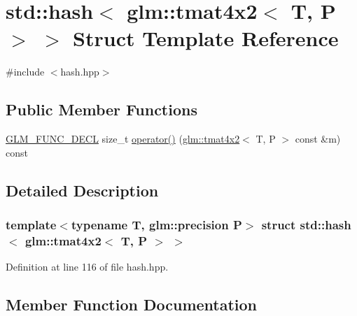 \hypertarget{structstd_1_1hash_3_01glm_1_1tmat4x2_3_01_t_00_01_p_01_4_01_4}{}\section{std\+::hash$<$ glm\+::tmat4x2$<$ T, P $>$ $>$ Struct Template Reference}
\label{structstd_1_1hash_3_01glm_1_1tmat4x2_3_01_t_00_01_p_01_4_01_4}


{\ttfamily \#include $<$hash.\+hpp$>$}

\subsection*{Public Member Functions}
\begin{DoxyCompactItemize}
\item 
\mbox{\hyperlink{setup_8hpp_ab2d052de21a70539923e9bcbf6e83a51}{G\+L\+M\+\_\+\+F\+U\+N\+C\+\_\+\+D\+E\+CL}} size\+\_\+t \mbox{\hyperlink{structstd_1_1hash_3_01glm_1_1tmat4x2_3_01_t_00_01_p_01_4_01_4_af4488eb7a221447f2f833ce12549bd16}{operator()}} (\mbox{\hyperlink{structglm_1_1tmat4x2}{glm\+::tmat4x2}}$<$ T, P $>$ const \&m) const
\end{DoxyCompactItemize}


\subsection{Detailed Description}
\subsubsection*{template$<$typename T, glm\+::precision P$>$\newline
struct std\+::hash$<$ glm\+::tmat4x2$<$ T, P $>$ $>$}



Definition at line 116 of file hash.\+hpp.



\subsection{Member Function Documentation}
\mbox{\label{structstd_1_1hash_3_01glm_1_1tmat4x2_3_01_t_00_01_p_01_4_01_4_af4488eb7a221447f2f833ce12549bd16}} 
